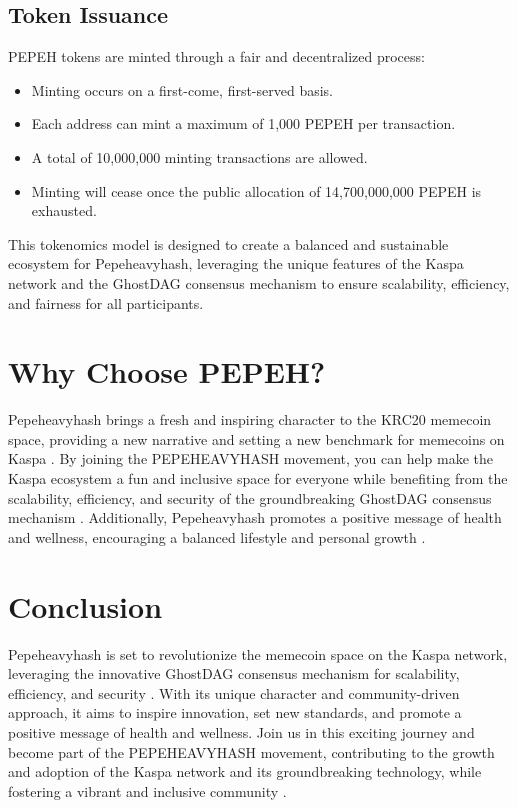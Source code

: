 \documentclass{article}
\begin{document}
\subsection{Token Issuance}

PEPEH tokens are minted through a fair and decentralized process:

\begin{itemize}
    \item Minting occurs on a first-come, first-served basis.
    \item Each address can mint a maximum of 1,000 PEPEH per transaction.
    \item A total of 10,000,000 minting transactions are allowed.
    \item Minting will cease once the public allocation of 14,700,000,000 PEPEH is exhausted.
\end{itemize}

This tokenomics model is designed to create a balanced and sustainable ecosystem for Pepeheavyhash, leveraging the unique features of the Kaspa network and the GhostDAG consensus mechanism to ensure scalability, efficiency, and fairness for all participants.

\section{Why Choose PEPEH?}
Pepeheavyhash brings a fresh and inspiring character to the KRC20 memecoin space, providing a new narrative and setting a new benchmark for memecoins on Kaspa \citep{memecoinfuture2024}. By joining the PEPEHEAVYHASH movement, you can help make the Kaspa ecosystem a fun and inclusive space for everyone while benefiting from the scalability, efficiency, and security of the groundbreaking GhostDAG consensus mechanism \citep{sompolinsky2020phantom}. Additionally, Pepeheavyhash promotes a positive message of health and wellness, encouraging a balanced lifestyle and personal growth \citep{cryptowellness2023}.

\section{Conclusion}
Pepeheavyhash is set to revolutionize the memecoin space on the Kaspa network, leveraging the innovative GhostDAG consensus mechanism for scalability, efficiency, and security \citep{sompolinsky2020phantom, kaspadev2024}. With its unique character and community-driven approach, it aims to inspire innovation, set new standards, and promote a positive message of health and wellness. Join us in this exciting journey and become part of the PEPEHEAVYHASH movement, contributing to the growth and adoption of the Kaspa network and its groundbreaking technology, while fostering a vibrant and inclusive community \citep{cryptocommunity2024}.



\end{document}
